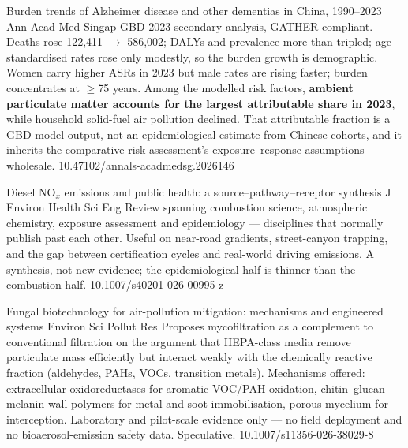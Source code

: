 \documentclass[10pt]{article}
\begin{document}
{Burden trends of Alzheimer disease and other dementias in China, 1990--2023}
{Ann Acad Med Singap}
{GBD 2023 secondary analysis, GATHER-compliant. Deaths rose 122{,}411 $\rightarrow$
586{,}002; DALYs and prevalence more than tripled; age-standardised rates rose only
modestly, so the burden growth is demographic. Women carry higher ASRs in 2023 but male
rates are rising faster; burden concentrates at $\geq$75 years. Among the modelled risk
factors, \textbf{ambient particulate matter accounts for the largest attributable share
in 2023}, while household solid-fuel air pollution declined. That attributable fraction
is a GBD model output, not an epidemiological estimate from Chinese cohorts, and it
inherits the comparative risk assessment's exposure--response assumptions wholesale.}
{10.47102/annals-acadmedsg.2026146}

{Diesel NO$_x$ emissions and public health: a source--pathway--receptor synthesis}
{J Environ Health Sci Eng}
{Review spanning combustion science, atmospheric chemistry, exposure assessment and
epidemiology --- disciplines that normally publish past each other. Useful on near-road
gradients, street-canyon trapping, and the gap between certification cycles and
real-world driving emissions. A synthesis, not new evidence; the epidemiological half is
thinner than the combustion half.}
{10.1007/s40201-026-00995-z}

{Fungal biotechnology for air-pollution mitigation: mechanisms and engineered systems}
{Environ Sci Pollut Res}
{Proposes mycofiltration as a complement to conventional filtration on the argument that
HEPA-class media remove particulate mass efficiently but interact weakly with the
chemically reactive fraction (aldehydes, PAHs, VOCs, transition metals). Mechanisms
offered: extracellular oxidoreductases for aromatic VOC/PAH oxidation,
chitin--glucan--melanin wall polymers for metal and soot immobilisation, porous mycelium
for interception. Laboratory and pilot-scale evidence only --- no field deployment and no
bioaerosol-emission safety data. Speculative.}
{10.1007/s11356-026-38029-8}

\end{document}
